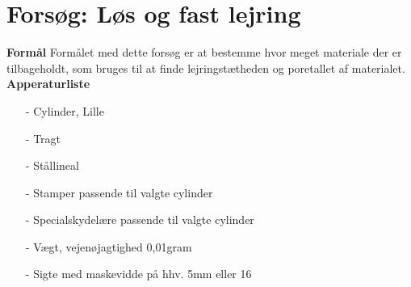 \chapter{Forsøg:  Løs og fast lejring}

\textbf{Formål}
\newline
Formålet med dette forsøg er at bestemme hvor meget materiale der er tilbageholdt, som bruges til at finde lejringstætheden og poretallet af materialet.
\newline
\newline
\textbf{Apperaturliste}
\begin{itemize}
	\item[-] Cylinder, Lille
	\item[-] Tragt
	\item[-] Stållineal
	\item[-] Stamper passende til valgte cylinder
	\item[-] Specialskydelære passende til valgte cylinder
	\item[-] Vægt, vejenøjagtighed 0,01gram
	\item[-] Sigte med maskevidde på hhv. 5mm eller 16
\end{itemize}

